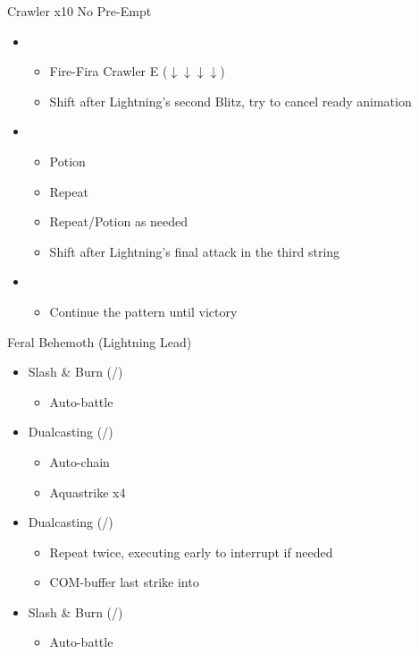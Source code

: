 \begin{multicols}{2}
\begin{battle}{Crawler x10 No Pre-Empt}
\begin{itemize}
    \item \first
    \begin{itemize}
        \item Fire-Fira Crawler E ($\downarrow \downarrow \downarrow \downarrow$)
        \item Shift after Lightning's second Blitz, try to cancel ready animation
    \end{itemize}
    \item \sixth
    \begin{itemize}
        \item Potion
        \item Repeat
        \item Repeat/Potion as needed
        \item Shift after Lightning's final attack in the third string
    \end{itemize}
    \item \first
    \begin{itemize}
        \item Continue the pattern until victory
    \end{itemize}
\end{itemize}
\end{battle}
\renewcommand{\first}{[1] Slash \& Burn (\com/\rav)}
\renewcommand{\second}{[2] War \& Peace (\com/\med)}
\renewcommand{\third}{[3] Supersoldier (\com/\syn)}
\renewcommand{\fourth}{[4] Dualcasting (\rav/\rav)}
\renewcommand{\fifth}{[5] Dualcasting (\rav/\rav)}
\renewcommand{\sixth}{[6] Slash \& Burn (\com/\rav)}
\begin{battle}{Feral Behemoth (Lightning Lead)}
\begin{itemize}
    \item \first
    \begin{itemize}
        \item Auto-battle
    \end{itemize}
    \item \fourth
    \begin{itemize}
        \item Auto-chain
        \item Aquastrike x4
    \end{itemize}
    \item \fifth
    \begin{itemize}
        \item Repeat twice, executing early to interrupt if needed
        \item COM-buffer last strike into
    \end{itemize}
    \item \sixth
    \begin{itemize}
        \item Auto-battle
    \end{itemize}
\end{itemize}
\end{battle}


\end{multicols}
